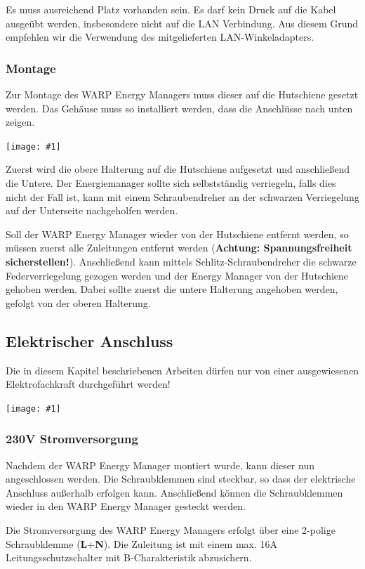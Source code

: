 \documentclass[a4paper,10pt]{article}
\newcommand{\hint}[1]{\begin{tcolorbox}[colback=boxgray,colframe=black,coltext=
white,title=Hinweis,left*=2mm,right*=2mm,boxsep=1mm,bottom=1mm,top=1mm]#1\end{tcolorbox}}
\newcommand{\gfx}[1]{\texttt{[image: \#1]}}
\begin{document}
\begin{multicols*}{2}
	Es muss ausreichend Platz vorhanden sein. Es darf kein Druck auf die Kabel
	ausgeübt werden, insbesondere nicht auf die LAN Verbindung. Aus diesem Grund
	empfehlen wir die Verwendung des mitgelieferten LAN-Winkeladapters.

	\subsubsection{Montage}
	Zur Montage des WARP Energy Managers muss dieser auf die Hutschiene
	gesetzt werden. Das Gehäuse muss so installiert werden, dass die Anschlüsse
	nach unten zeigen.

	\gfx{./img/wem_mounting.jpg}

	Zuerst wird die obere Halterung auf die Hutschiene aufgesetzt und anschließend
	die Untere. Der Energiemanager sollte sich selbstständig verriegeln, falls dies
	nicht der Fall ist, kann mit einem Schraubendreher an der schwarzen Verriegelung
	auf der Unterseite nachgeholfen werden.
	\par
	Soll der WARP Energy Manager wieder von der Hutschiene entfernt werden, so
	müssen zuerst alle Zuleitungen entfernt werden (\textbf{Achtung: Spannungsfreiheit
	sicherstellen!}). Anschließend kann mittels Schlitz-Schraubendreher die schwarze
	Federverriegelung gezogen werden und der Energy Manager von der Hutschiene
	gehoben werden. Dabei sollte zuerst die untere Halterung angehoben werden, 
	gefolgt von der oberen Halterung.

	\newpage
	\subsection{Elektrischer Anschluss}
	\hint{Die in diesem Kapitel beschriebenen Arbeiten dürfen nur von einer ausgewiesenen
		Elektrofachkraft durchgeführt werden!}

	\gfx{./img/wem_connections.jpg}


	\subsubsection{230V Stromversorgung}
	Nachdem der WARP Energy Manager montiert wurde, kann dieser nun angeschlossen werden.
	Die Schraubklemmen sind steckbar, so dass der elektrische Anschluss
	außerhalb erfolgen kann. Anschließend können die Schraubklemmen wieder in
	den WARP Energy Manager gesteckt werden.

	Die Stromversorgung des WARP Energy Managers erfolgt über eine 2-polige
	Schraubklemme (\textbf{L}+\textbf{N}). Die Zuleitung ist mit einem max. 16A Leitungsschutzschalter mit
	B-Charakteristik abzusichern.


\end{multicols*}
\end{document}
